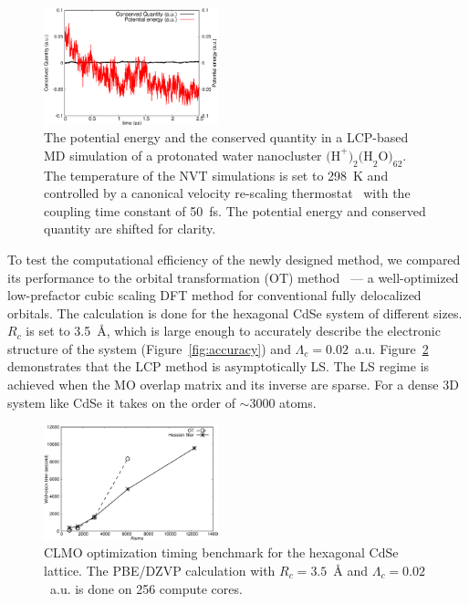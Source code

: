 \documentclass[aps,prl,twocolumn,reprint,amsmath,amssymb]{revtex4-1}
\begin{document}

\begin{figure}
\includegraphics[width=0.45\textwidth]{const.eps}
\caption{The potential energy and the conserved quantity in a LCP-based MD simulation of a protonated water nanocluster $\text{(H}^{+}\text{)}_2\text{(H}_2\text{O)}_{62}$. The temperature of the NVT simulations is set to 298~K and controlled by a canonical velocity re-scaling thermostat~\cite{bussi2007canonical} with the coupling time constant of 50~fs. The potential energy and conserved quantity are shifted for clarity.}
\label{fig:md}
\end{figure}



To test the computational efficiency of the newly designed method, we compared its performance to the orbital transformation (OT) method~\cite{weber2008direct,vandevondele2003efficient} --- a well-optimized low-prefactor cubic scaling DFT method for conventional fully delocalized orbitals. The calculation is done for the hexagonal CdSe system of different sizes. $R_c$ is set to 3.5~{\AA}, which is large enough to accurately describe the electronic structure of the system (Figure~\ref{fig:accuracy}) and $\Lambda_c = 0.02$~a.u. Figure~\ref{fig:scaling} demonstrates that the LCP method is asymptotically LS. The LS regime is achieved when the MO overlap matrix and its inverse are sparse. For a dense 3D system like CdSe it takes on the order of $\sim$3000 atoms. 

\begin{figure}
\centering
\includegraphics[width=0.45\textwidth]{timing}
\caption{CLMO optimization timing benchmark for the hexagonal CdSe lattice. The PBE/DZVP calculation with $R_c=3.5$~{\AA} and $\Lambda_c = 0.02$~a.u. is done on 256 compute cores.}
\label{fig:scaling}
\end{figure}
\end{document}
